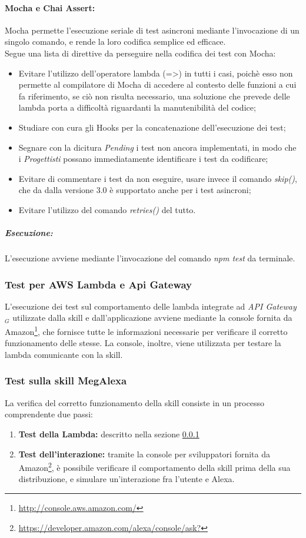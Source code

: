 \paragraph{Mocha e Chai Assert:} Mocha permette l'esecuzione seriale di test asincroni mediante l'invocazione di un singolo comando, e rende la loro codifica semplice ed efficace.\\
Segue una lista di direttive da perseguire nella codifica dei test con Mocha:
\begin{itemize}
	\item Evitare l'utilizzo dell'operatore lambda (=>) in tutti i casi, poichè esso non permette al compilatore di Mocha di accedere al contesto delle funzioni a cui fa riferimento, se ciò non risulta necessario, una soluzione che prevede delle lambda porta a difficoltà riguardanti la manutenibilità del codice;
	\item Studiare con cura gli Hooks per la concatenazione dell'esecuzione dei test;
	\item Segnare con la dicitura \textit{Pending} i test non ancora implementati, in modo che i \textit{Progettisti} possano immediatamente identificare i test da codificare;
	\item Evitare di commentare i test da non eseguire, usare invece il comando \textit{skip()}, che da dalla versione 3.0 è supportato anche per i test asincroni;
	\item Evitare l'utilizzo del comando \textit{retries()} del tutto.
\end{itemize}

\subparagraph{Esecuzione:} L'esecuzione avviene mediante l'invocazione del comando \textit{npm test} da terminale. 

\subsubsection{Test per AWS Lambda e Api Gateway}\label{labmdatest}
L'esecuzione dei test sul comportamento delle lambda integrate ad \textit{API Gateway$_{G}$} utilizzate dalla skill e dall'applicazione avviene mediante la console fornita da Amazon\footnote{\url{http://console.aws.amazon.com/}}, che fornisce tutte le informazioni necessarie per verificare il corretto funzionamento delle stesse.
La console, inoltre, viene utilizzata per testare la lambda comunicante con la skill.

\subsubsection{Test sulla skill MegAlexa}
La verifica del corretto funzionamento della skill consiste in un processo comprendente due passi:
\begin{enumerate}
	\item 	\textbf{Test della Lambda:} descritto nella sezione \ref{labmdatest}
	\item \textbf{Test dell'interazione:} tramite la console per sviluppatori fornita da Amazon\footnote{\url{https://developer.amazon.com/alexa/console/ask?}}, è possibile verificare il comportamento della skill prima della sua distribuzione, e simulare un'interazione fra l'utente e Alexa.
\end{enumerate}
